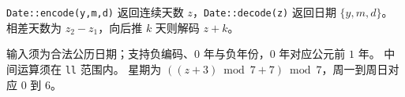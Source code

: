 \texttt{Date::encode(y,m,d)} 返回连续天数 $z$，\texttt{Date::decode(z)} 返回日期 $\{y,m,d\}$。
相差天数为 $z_2-z_1$，向后推 $k$ 天则解码 $z+k$。

输入须为合法公历日期；支持负编码、$0$ 年与负年份，$0$ 年对应公元前 $1$ 年。
中间运算须在 \texttt{ll} 范围内。
星期为 $((z+3)\bmod 7+7)\bmod 7$，周一到周日对应 $0$ 到 $6$。
